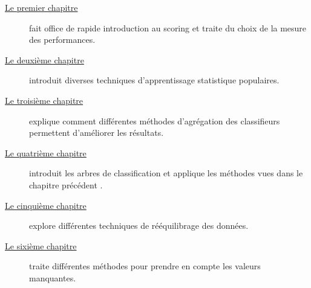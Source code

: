 \begin{description}
\item[{\hyperref[chap:un]{Le premier chapitre}}]
fait office de rapide introduction au scoring et traite du choix de la mesure des performances.
\item[{\hyperref[chap:deux]{Le deuxième chapitre}}]
introduit diverses techniques d'apprentissage statistique populaires.
\item[{\hyperref[chap:trois]{Le troisième chapitre}}]
explique comment différentes méthodes d'agrégation des classifieurs permettent d'améliorer les résultats.
\item[{\hyperref[chap:quatre]{Le quatrième chapitre}}]
introduit les arbres de classification et applique les méthodes vues dans le chapitre précédent .
\item[{\hyperref[chap:cinq]{Le cinquième chapitre}}]
explore différentes techniques de rééquilibrage des données.
\item[{\hyperref[chap:six]{Le sixième chapitre}}]
traite différentes méthodes pour prendre en compte les valeurs manquantes.
\end{description}

